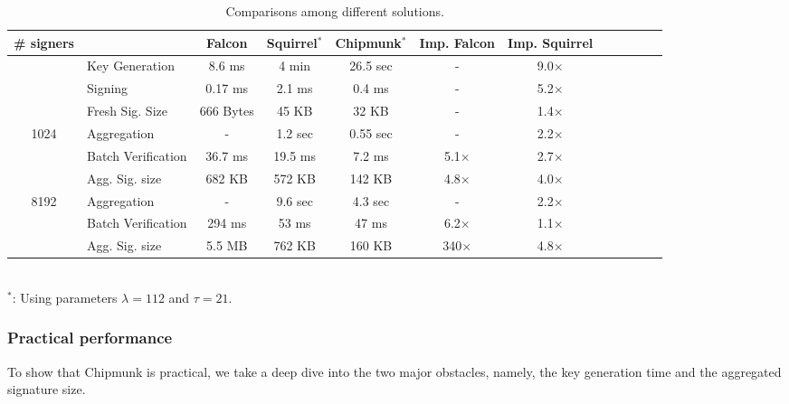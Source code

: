 \begin{table}\centering
  \begin{tabular}{|c||l|c|c|c||c|c|c|c||c|c|c|}\hline
    \# signers      &                 & Falcon      & Squirrel$^{*}$  & Chipmunk$^{*}$  & Imp. Falcon & Imp. Squirrel \\\hline\hline
    \multirow{2}{*}{} 
                    & Key Generation  & 8.6 ms      & 4 min     & 26.5 sec  &     -       & 9.0$\times$ \\\cline{2-7}
                    & Signing         & 0.17 ms     & 2.1 ms    & 0.4 ms    &     -       & 5.2$\times$ \\\cline{2-7}
                    &Fresh Sig. Size  & 666 Bytes   & 45 KB     & 32 KB     &     -       & 1.4$\times$ \\\hline\hline
    \multirow{3}{*}{1024}                
                    &Aggregation      & -           & 1.2 sec   & 0.55 sec  &     -       & 2.2$\times$ \\\cline{2-7}
                    &Batch Verification    
                                      & 36.7 ms     & 19.5 ms   & 7.2 ms    & 5.1$\times$ & 2.7$\times$ \\\cline{2-7}
                    
                    &Agg. Sig. size   & 682 KB      & 572 KB    & 142 KB    & 4.8$\times$ & 4.0$\times$ \\\hline\hline
    \multirow{3}{*}{8192}                
                    &Aggregation      & -           & 9.6 sec   & 4.3 sec   &     -       & 2.2$\times$ \\\cline{2-7}
                    &Batch Verification    
                                      & 294 ms      & 53  ms    &  47 ms    & 6.2$\times$ & 1.1$\times$ \\\cline{2-7}
                    &Agg. Sig. size   & 5.5 MB      & 762 KB    & 160 KB    & 340$\times$ & 4.8$\times$ \\\hline
  \end{tabular}\\
  $^{*}$: Using parameters $\lambda = 112$ and $\tau=21$.
  \caption{Comparisons among different solutions.}
\end{table}

\subsubsection{Practical performance}
To show that Chipmunk is practical, 
we take a deep dive into the two major obstacles, namely, the key generation time and the aggregated signature size.


